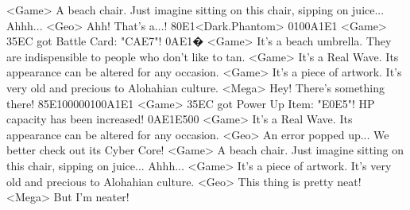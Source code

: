 <Game> A beach chair. Just imagine sitting on this chair, sipping on juice... Ahhh... 
<Geo> Ahh! That's a...! 
{80}{E1}<Dark.Phantom> {01}{00}{A1}{E1} 
<Game> {35}{EC} got Battle Card: "{CA}{E7}"! 
{0A}{E1}�
<Game> It's a beach umbrella. They are indispensible to people who don't like to tan. 
<Game> It's a Real Wave. Its appearance can be altered for any occasion. 
<Game> It's a piece of artwork. It's very old and precious to Alohahian culture. 
<Mega> Hey! There's something there! 
{85}{E1}{00}{00}{01}{00}{A1}{E1} 
<Game> {35}{EC} got Power Up Item: "{E0}{E5}"! 
HP capacity has been increased! 
{0A}{E1}{E5}{00}
<Game> It's a Real Wave. Its appearance can be altered for any occasion. 
<Geo> An error popped up... We better check out its Cyber Core! 
<Game> A beach chair. Just imagine sitting on this chair, sipping on juice... Ahhh... 
<Game> It's a piece of artwork. It's very old and precious to Alohahian culture. 
<Geo> This thing is pretty neat! 
<Mega> But I'm neater! 
